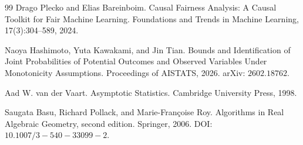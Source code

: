 \documentclass{article}
\begin{document}
\begin{thebibliography}{99}
   Drago Plecko and Elias Bareinboim. Causal Fairness Analysis: A Causal Toolkit for Fair Machine Learning. Foundations and Trends in Machine Learning, 17(3):304--589, 2024.

   Naoya Hashimoto, Yuta Kawakami, and Jin Tian. Bounds and Identification of Joint Probabilities of Potential Outcomes and Observed Variables Under Monotonicity Assumptions. Proceedings of AISTATS, 2026. arXiv: \(2602.18762\).

   Aad W. van der Vaart. Asymptotic Statistics. Cambridge University Press, 1998.

   Saugata Basu, Richard Pollack, and Marie-Fran\c{c}oise Roy. Algorithms in Real Algebraic Geometry, second edition. Springer, 2006. DOI: \(10.1007/3-540-33099-2\).

\end{thebibliography}
\end{document}
